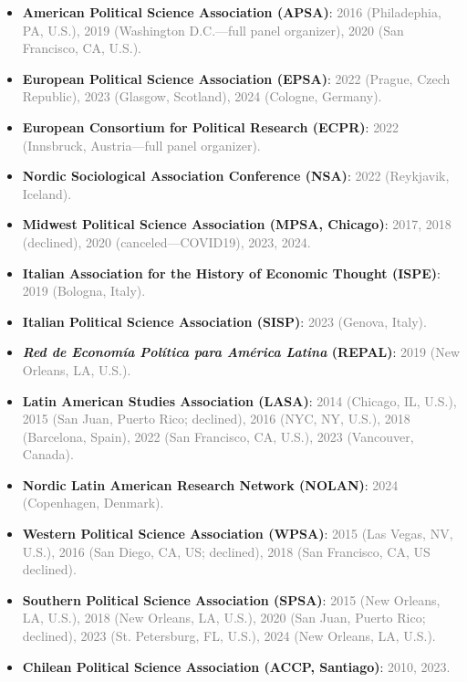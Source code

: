 \begin{itemize}
\item[\textcolor{gray}{\textbullet}] {\bf American Political Science Association (APSA)}: \textcolor{gray}{2016 (Philadephia, PA, U.S.), 2019 (Washington D.C.---full panel organizer), 2020 (San Francisco, CA, U.S.).}
\item[\textcolor{gray}{\textbullet}] {\bf European Political Science Association (EPSA)}: \textcolor{gray}{2022 (Prague, Czech Republic), 2023 (Glasgow, Scotland), 2024 (Cologne, Germany).}
\item[\textcolor{gray}{\textbullet}] {\bf European Consortium for Political Research (ECPR)}: \textcolor{gray}{2022 (Innsbruck, Austria---full panel organizer).}
\item[\textcolor{gray}{\textbullet}] {\bf Nordic Sociological Association Conference (NSA)}: \textcolor{gray}{2022 (Reykjavik, Iceland).}
\item[\textcolor{gray}{\textbullet}] {\bf Midwest Political Science Association (MPSA, Chicago)}: \textcolor{gray}{2017, 2018 (declined), 2020 (canceled---COVID19), 2023, 2024.}
\item[\textcolor{gray}{\textbullet}] {\bf Italian Association for the History of Economic Thought (ISPE)}: \textcolor{gray}{2019 (Bologna, Italy).}
\item[\textcolor{gray}{\textbullet}] {\bf Italian Political Science Association (SISP)}: \textcolor{gray}{2023 (Genova, Italy).}
\item[\textcolor{gray}{\textbullet}] {\bf \emph{Red de Econom\'ia Pol\'itica para Am\'erica Latina} (REPAL)}: \textcolor{gray}{2019 (New Orleans, LA, U.S.).}
\item[\textcolor{gray}{\textbullet}] {\bf Latin American Studies Association (LASA)}: \textcolor{gray}{2014 (Chicago, IL, U.S.), 2015 (San Juan, Puerto Rico; declined), 2016 (NYC, NY, U.S.), 2018 (Barcelona, Spain), 2022 (San Francisco, CA, U.S.), 2023 (Vancouver, Canada).}
\item[\textcolor{gray}{\textbullet}] {\bf Nordic Latin American Research Network (NOLAN)}: \textcolor{gray}{2024 (Copenhagen, Denmark).}
\item[\textcolor{gray}{\textbullet}] {\bf Western Political Science Association (WPSA)}: \textcolor{gray}{2015 (Las Vegas, NV, U.S.), 2016 (San Diego, CA, US; declined), 2018 (San Francisco, CA, US declined).}
\item[\textcolor{gray}{\textbullet}] {\bf Southern Political Science Association (SPSA)}: \textcolor{gray}{2015 (New Orleans, LA, U.S.), 2018 (New Orleans, LA, U.S.), 2020 (San Juan, Puerto Rico; declined), 2023 (St. Petersburg, FL, U.S.), 2024 (New Orleans, LA, U.S.).}
\item[\textcolor{gray}{\textbullet}] {\bf Chilean Political Science Association (ACCP, Santiago)}: \textcolor{gray}{2010, 2023.}


\end{itemize}
